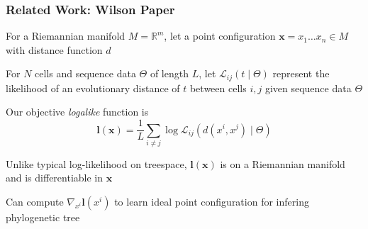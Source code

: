 \documentclass[
	11pt, %
]{beamer}
\begin{document}

\begin{frame}
	\frametitle{Related Work: Wilson Paper}

	For a Riemannian manifold $M=\mathbb{R}^m$, let a point configuration $\mathbf{x}=x_1 \ldots x_n \in M$ with distance function $d$

	\bigskip

	For $N$ cells and sequence data $\Theta$ of length $L$, let $\mathcal{L}_{ij}(t \mid \Theta)$ represent the likelihood of an evolutionary distance of $t$ between cells $i,j$ given sequence data $\Theta$

	\pause

	\bigskip

	Our objective \emph{logalike} function is
	\begin{equation*}
		\mathbf{l}(\mathbf{x})=\frac{1}{L} \sum_{i \neq j} \log \mathcal{L}_{ij}(d(x^i, x^j) \mid \Theta)
	\end{equation*}
	\pause 

	Unlike typical log-likelihood on treespace, $\mathbf{l}(\mathbf{x})$ is on a Riemannian manifold and is differentiable in $\mathbf{x}$
	\bigskip
	
	Can compute $\nabla_{x^i} \mathbf{l}(x^i)$ to learn ideal point configuration for infering phylogenetic tree
\end{frame}

\end{document}
